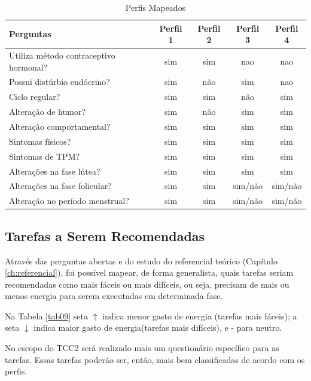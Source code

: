 \begin{table}[]
    \caption{Perfis Mapeados}
    \label{tab08}
    \begin{tabular}{|l|c|c|c|c|}
    \hline
    \rowcolor[HTML]{C0C0C0} 
     Perguntas & Perfil 1 & Perfil 2 & Perfil 3 & Perfil 4 \\ \hline
     Utiliza método contraceptivo hormonal?& sim & sim & nao & nao \\ \hline
    \rowcolor[HTML]{EFEFEF} 
    Possui distúrbio endócrino? & sim & não & sim & nao \\ \hline
    Ciclo regular? & sim & sim & não & sim \\ \hline
    \rowcolor[HTML]{EFEFEF} 
    Alteração de humor? & sim & não & sim & sim \\ \hline
    Alteração comportamental? & sim & sim & sim & sim \\ \hline
    \rowcolor[HTML]{EFEFEF} 
    Sintomas físicos? & sim & sim & sim & sim \\ \hline
    Sintomas de TPM? & sim & sim & sim & sim \\ \hline
    \rowcolor[HTML]{EFEFEF} 
    Alterações na fase lútea? & sim & sim & sim & sim \\ \hline
    Alterações na fase folicular? & sim & sim & sim/não & sim/não \\ \hline
    \rowcolor[HTML]{EFEFEF} 
    Alteração no período menstrual? & sim & sim & sim/não & sim/não \\ \hline
    \end{tabular}
    \end{table}

\subsection{Tarefas a Serem Recomendadas}

Através das perguntas abertas e do estudo do referencial teórico (Capítulo \ref{ch:referencial}), 
foi possível mapear, de forma generalista, quais tarefas seriam 
recomendadas 
como mais fáceis ou mais difíceis, ou seja, precisam de 
mais ou menos energia para serem executadas em determinada fase. 

Na Tabela \ref{tab09} seta $\uparrow$ indica menor gasto de energia
(tarefas mais fáceis); a seta $\downarrow$ indica maior gasto de 
energia(tarefas mais difíceis), e - para neutro.

No escopo do TCC2 será realizado mais um questionário específico para as 
tarefas. Essas tarefas poderão ser, então, mais bem classificadas de acordo 
com os perfis.

